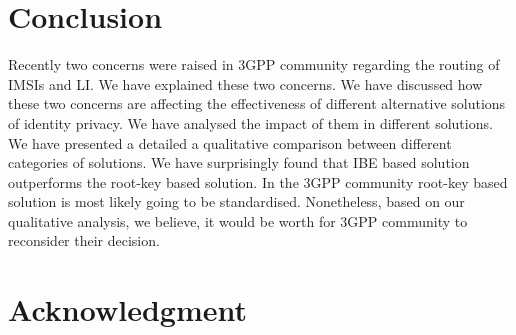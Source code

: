 \documentclass[conference]{IEEEtran}
\begin{document}
\section{Conclusion}
Recently two concerns were raised in 3GPP community regarding the routing of IMSIs and LI. We have explained these two concerns. We have discussed how these two concerns are affecting the effectiveness of different alternative solutions of identity privacy. We have analysed the impact of them in different solutions. We have presented a detailed a qualitative comparison between different categories of solutions. We have surprisingly found that IBE based solution outperforms the root-key based solution. In the 3GPP community root-key based solution is most likely going to be standardised. Nonetheless, based on our qualitative analysis, we believe, it would be worth for 3GPP community to reconsider their decision.

\section*{Acknowledgment}
\end{document}
